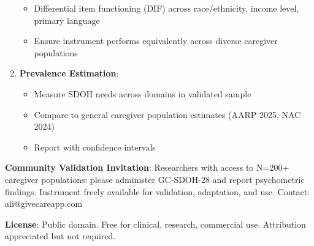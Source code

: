 \documentclass[
]{article}
\providecommand{\tightlist}{%
  \setlength{\itemsep}{0pt}\setlength{\parskip}{0pt}}
\begin{document}
\begin{enumerate}
  \begin{itemize}
  \tightlist
  \item
    Differential item functioning (DIF) across race/ethnicity, income
    level, primary language
  \item
    Ensure instrument performs equivalently across diverse caregiver
    populations
  \end{itemize}
\item
  \textbf{Prevalence Estimation}:

  \begin{itemize}
  \tightlist
  \item
    Measure SDOH needs across domains in validated sample
  \item
    Compare to general caregiver population estimates (AARP 2025, NAC
    2024)
  \item
    Report with confidence intervals
  \end{itemize}
\end{enumerate}

\textbf{Community Validation Invitation}: Researchers with access to
N=200+ caregiver populations: please administer GC-SDOH-28 and report
psychometric findings. Instrument freely available for validation,
adaptation, and use. Contact: ali@givecareapp.com

\textbf{License}: Public domain. Free for clinical, research, commercial
use. Attribution appreciated but not required.
\end{document}

